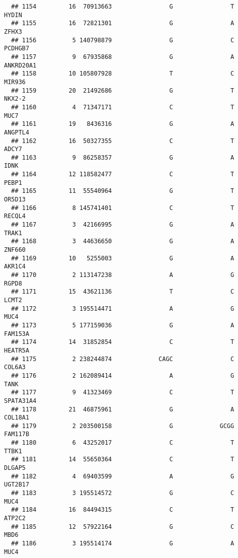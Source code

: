 \documentclass[12pt,twoside]{reedthesis}
\theoremstyle{definition}
\theoremstyle{definition}
\theoremstyle{remark}
\begin{document}
\begin{verbatim}
  ## 1154         16  70913663                G                T          HYDIN
  ## 1155         16  72821301                G                A          ZFHX3
  ## 1156          5 140798879                G                C        PCDHGB7
  ## 1157          9  67935868                G                A      ANKRD20A1
  ## 1158         10 105807928                T                C         MIR936
  ## 1159         20  21492686                G                T         NKX2-2
  ## 1160          4  71347171                C                T           MUC7
  ## 1161         19   8436316                G                A        ANGPTL4
  ## 1162         16  50327355                C                T          ADCY7
  ## 1163          9  86258357                G                A           IDNK
  ## 1164         12 118582477                C                T          PEBP1
  ## 1165         11  55540964                G                T         OR5D13
  ## 1166          8 145741401                C                T         RECQL4
  ## 1167          3  42166995                G                A          TRAK1
  ## 1168          3  44636650                G                A         ZNF660
  ## 1169         10   5255003                G                A         AKR1C4
  ## 1170          2 113147238                A                G          RGPD8
  ## 1171         15  43621136                T                C          LCMT2
  ## 1172          3 195514471                A                G           MUC4
  ## 1173          5 177159036                G                A        FAM153A
  ## 1174         14  31852854                C                T        HEATR5A
  ## 1175          2 238244874             CAGC                C         COL6A3
  ## 1176          2 162089414                A                G           TANK
  ## 1177          9  41323469                C                T      SPATA31A4
  ## 1178         21  46875961                G                A        COL18A1
  ## 1179          2 203500158                G             GCGG        FAM117B
  ## 1180          6  43252017                C                T          TTBK1
  ## 1181         14  55650364                C                T         DLGAP5
  ## 1182          4  69403599                A                G        UGT2B17
  ## 1183          3 195514572                G                C           MUC4
  ## 1184         16  84494315                C                T         ATP2C2
  ## 1185         12  57922164                G                C           MBD6
  ## 1186          3 195514174                G                A           MUC4

\end{verbatim}
\end{document}
